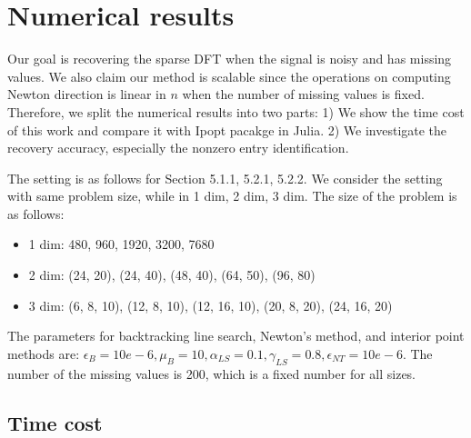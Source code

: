\documentclass[final,onefignum,onetabnum]{siamart190516}
\begin{document}
\section{Numerical results}\label{sec:numerical_results}
Our goal is recovering the sparse DFT when the signal is noisy and has missing values. We also claim our method is scalable since the operations on computing Newton direction is linear in $n$ when the number of missing values is fixed. Therefore, we split the numerical results into two parts: 1) We show the time cost of this work and compare it with Ipopt pacakge in Julia. 2) We investigate the recovery accuracy, especially the nonzero entry identification.

The setting is as follows for Section 5.1.1, 5.2.1, 5.2.2. We consider the setting with same problem size, while in 1 dim, 2 dim, 3 dim. The size of the problem is as follows:
\begin{itemize}
    \item 1 dim: 480, 960, 1920, 3200, 7680
    \item 2 dim: (24, 20), (24, 40), (48, 40), (64, 50), (96, 80)
    \item 3 dim: (6, 8, 10), (12, 8, 10), (12, 16, 10), (20, 8, 20), (24, 16, 20)
\end{itemize}
The parameters for backtracking line search, Newton's method, and interior point methods are: $\epsilon_B = 10e-6, \mu_B = 10, \alpha_{LS} = 0.1, \gamma_{LS} = 0.8, \epsilon_{NT} = 10e-6.$ The number of the missing values is 200, which is a fixed number for all sizes.
\subsection{Time cost}
\end{document}
